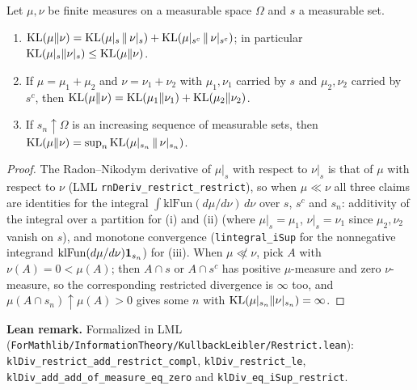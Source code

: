 \begin{lemma}\label{lem:pinfo_kl_restrict}
\leanok
Let $\mu, \nu$ be finite measures on a measurable space $\Omega$ and $s$ a measurable set.
\begin{enumerate}
  \item[(i)] $\mathrm{KL}(\mu\|\nu) = \mathrm{KL}(\mu|_s\,\|\,\nu|_s) + \mathrm{KL}(\mu|_{s^c}\,\|\,\nu|_{s^c})$; in
        particular $\mathrm{KL}(\mu|_s\|\nu|_s) \le \mathrm{KL}(\mu\|\nu)$.
  \item[(ii)] If $\mu = \mu_1 + \mu_2$ and $\nu = \nu_1 + \nu_2$ with $\mu_1, \nu_1$ carried by
        $s$ and $\mu_2, \nu_2$ carried by $s^c$, then $\mathrm{KL}(\mu\|\nu) = \mathrm{KL}(\mu_1\|\nu_1) + \mathrm{KL}(\mu_2\|\nu_2)$.
  \item[(iii)] If $s_n \uparrow \Omega$ is an increasing sequence of measurable sets, then
        $\mathrm{KL}(\mu\|\nu) = \sup_n \mathrm{KL}(\mu|_{s_n}\,\|\,\nu|_{s_n})$.
\end{enumerate}
\end{lemma}

\begin{proof}
\leanok
The Radon--Nikodym derivative of $\mu|_s$ with respect to $\nu|_s$ is that of $\mu$ with
respect to $\nu$ (LML \texttt{rnDeriv\_restrict\_restrict}), so when $\mu \ll \nu$ all three
claims are identities for the integral $\int \mathrm{klFun}(d\mu/d\nu)\,d\nu$ over $s$, $s^c$ and
$s_n$: additivity of the integral over a partition for (i) and (ii) (where
$\mu|_s = \mu_1$, $\nu|_s = \nu_1$ since $\mu_2, \nu_2$ vanish on $s$), and monotone convergence
(\texttt{lintegral\_iSup} for the nonnegative integrand $\mathrm{klFun}(d\mu/d\nu)\mathbf{1}_{s_n}$)
for (iii). When $\mu \not\ll \nu$, pick $A$ with $\nu(A) = 0 < \mu(A)$; then $A \cap s$ or
$A \cap s^c$ has positive $\mu$-measure and zero $\nu$-measure, so the corresponding restricted
divergence is $\infty$ too, and $\mu(A \cap s_n) \uparrow \mu(A) > 0$ gives some $n$ with
$\mathrm{KL}(\mu|_{s_n}\|\nu|_{s_n}) = \infty$.
\end{proof}

\textbf{Lean remark.} Formalized in LML
(\texttt{ForMathlib/InformationTheory/KullbackLeibler/Restrict.lean}):
\texttt{klDiv\_restrict\_add\_restrict\_compl}, \texttt{klDiv\_restrict\_le},
\texttt{klDiv\_add\_add\_of\_measure\_eq\_zero} and \texttt{klDiv\_eq\_iSup\_restrict}.

